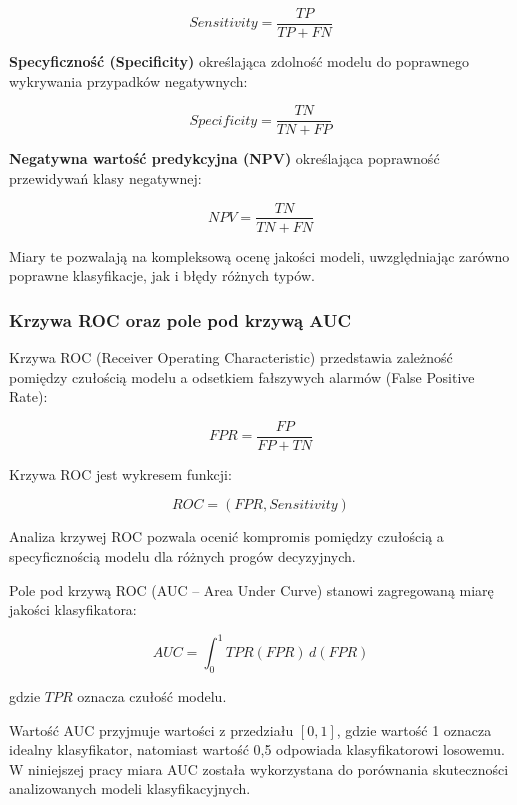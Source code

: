 \documentclass[twoside]{customStyle}
\begin{document}
\begin{equation}
Sensitivity = \frac{TP}{TP + FN}
\end{equation}

\textbf{Specyficzność (Specificity)} określająca zdolność modelu do poprawnego wykrywania przypadków negatywnych:

\begin{equation}
Specificity = \frac{TN}{TN + FP}
\end{equation}

\textbf{Negatywna wartość predykcyjna (NPV)} określająca poprawność przewidywań klasy negatywnej:

\begin{equation}
NPV = \frac{TN}{TN + FN}
\end{equation}

Miary te pozwalają na kompleksową ocenę jakości modeli, uwzględniając zarówno poprawne klasyfikacje, jak i błędy różnych typów.

\subsubsection{Krzywa ROC oraz pole pod krzywą AUC}

Krzywa ROC (Receiver Operating Characteristic) przedstawia zależność pomiędzy czułością modelu a odsetkiem fałszywych alarmów (False Positive Rate):

\begin{equation}
FPR = \frac{FP}{FP + TN}
\end{equation}

Krzywa ROC jest wykresem funkcji:

\begin{equation}
ROC = (FPR, Sensitivity)
\end{equation}

Analiza krzywej ROC pozwala ocenić kompromis pomiędzy czułością a specyficznością modelu dla różnych progów decyzyjnych.

Pole pod krzywą ROC (AUC -- Area Under Curve) stanowi zagregowaną miarę jakości klasyfikatora:

\begin{equation}
AUC = \int_{0}^{1} TPR(FPR)\, d(FPR)
\end{equation}

gdzie $TPR$ oznacza czułość modelu.

Wartość AUC przyjmuje wartości z przedziału $[0,1]$, gdzie wartość 1 oznacza idealny klasyfikator, natomiast wartość 0,5 odpowiada klasyfikatorowi losowemu. W niniejszej pracy miara AUC została wykorzystana do porównania skuteczności analizowanych modeli klasyfikacyjnych.
\end{document}
